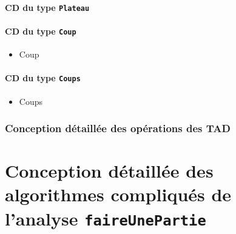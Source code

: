 \documentclass[11pt]{article}
\begin{document}
\subsection{CD du type \tt{Plateau}}
\begin{itemize}
\end{itemize}

\subsection{CD du type \tt{Coup}}
\begin{itemize}\item
\begin{algorithme}
\begin{enregistrement}{Coup}
\end{enregistrement}
\end{algorithme} 
\end{itemize}

\subsection{CD du type \tt{Coups}}
\begin{itemize}\item
\begin{algorithme}
\begin{enregistrement}{Coups}
\end{enregistrement}
\end{algorithme}
\end{itemize}

\section{Conception détaillée des opérations des TAD}

\part{Conception détaillée des algorithmes compliqués de l'analyse \tt{faireUnePartie}}
\setcounter{section}{0}
\end{document}
